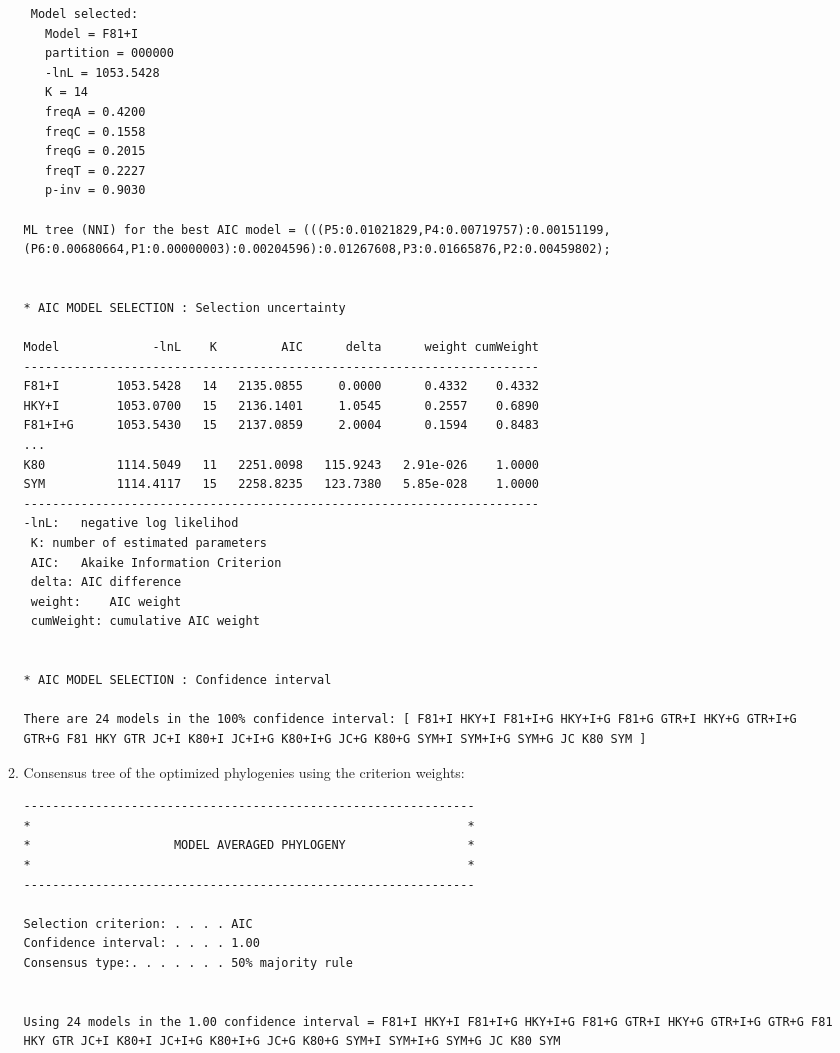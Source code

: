 \begin{enumerate}
\begin{enumerate}
\begin{lstlisting}
 Model selected: 
   Model = F81+I
   partition = 000000
   -lnL = 1053.5428
   K = 14
   freqA = 0.4200 
   freqC = 0.1558 
   freqG = 0.2015 
   freqT = 0.2227 
   p-inv = 0.9030 
 
ML tree (NNI) for the best AIC model = (((P5:0.01021829,P4:0.00719757):0.00151199,(P6:0.00680664,P1:0.00000003):0.00204596):0.01267608,P3:0.01665876,P2:0.00459802);
 
 
* AIC MODEL SELECTION : Selection uncertainty
 
Model             -lnL    K         AIC      delta      weight cumWeight
------------------------------------------------------------------------ 
F81+I        1053.5428   14   2135.0855     0.0000      0.4332    0.4332 
HKY+I        1053.0700   15   2136.1401     1.0545      0.2557    0.6890 
F81+I+G      1053.5430   15   2137.0859     2.0004      0.1594    0.8483
...
K80          1114.5049   11   2251.0098   115.9243   2.91e-026    1.0000 
SYM          1114.4117   15   2258.8235   123.7380   5.85e-028    1.0000
------------------------------------------------------------------------
-lnL:	negative log likelihod
 K:	number of estimated parameters
 AIC:	Akaike Information Criterion
 delta:	AIC difference
 weight:	AIC weight
 cumWeight:	cumulative AIC weight
 
 
* AIC MODEL SELECTION : Confidence interval
 
There are 24 models in the 100% confidence interval: [ F81+I HKY+I F81+I+G HKY+I+G F81+G GTR+I HKY+G GTR+I+G GTR+G F81 HKY GTR JC+I K80+I JC+I+G K80+I+G JC+G K80+G SYM+I SYM+I+G SYM+G JC K80 SYM ] 
\end{lstlisting}

\item Consensus tree of the optimized phylogenies using the criterion weights:
 
\begin{lstlisting}
---------------------------------------------------------------
*                                                             *
*                    MODEL AVERAGED PHYLOGENY                 *
*                                                             *
---------------------------------------------------------------
 
Selection criterion: . . . . AIC
Confidence interval: . . . . 1.00
Consensus type:. . . . . . . 50% majority rule
 
 
Using 24 models in the 1.00 confidence interval = F81+I HKY+I F81+I+G HKY+I+G F81+G GTR+I HKY+G GTR+I+G GTR+G F81 HKY GTR JC+I K80+I JC+I+G K80+I+G JC+G K80+G SYM+I SYM+I+G SYM+G JC K80 SYM  


\end{lstlisting}
\end{enumerate}
\end{enumerate}
